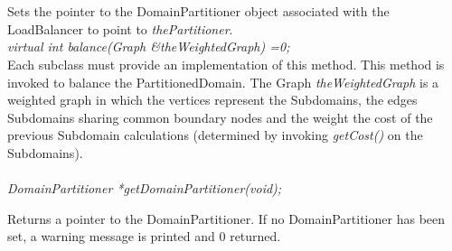  \\
 \\
Sets the pointer to the DomainPartitioner object associated with the
LoadBalancer to point to {\em thePartitioner}. \\

{\em virtual int balance(Graph \&theWeightedGraph) =0;} \\ 
Each subclass must provide an implementation of this method. This
method is invoked to balance the PartitionedDomain. The Graph {\em
theWeightedGraph} is a weighted graph in which the vertices represent
the Subdomains, the edges Subdomains sharing common boundary nodes and
the weight the cost of the previous Subdomain calculations (determined
by invoking {\em getCost()} on the Subdomains). \\


  \\
{\em DomainPartitioner *getDomainPartitioner(void); }

Returns a pointer to the DomainPartitioner. If no DomainPartitioner
has been set, a warning message is printed and $0$ returned. \\




